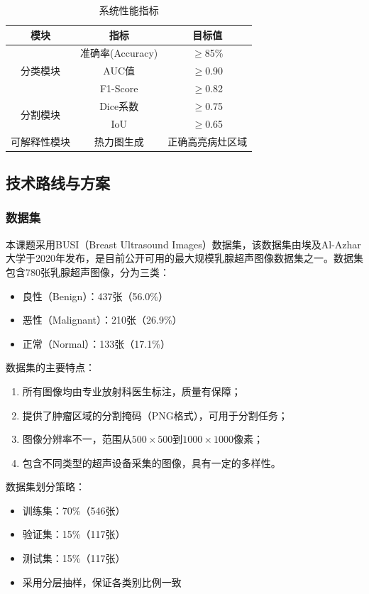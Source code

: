 \documentclass[supercite]{Hust-undergraduate-kaiti}
\theoremstyle{definition}
\begin{document}
\begin{table}[htb]
\centering
\caption{系统性能指标}
\begin{tabular}{|c|c|c|}
\hline
\textbf{模块} & \textbf{指标} & \textbf{目标值} \\ \hline
\multirow{3}{*}{分类模块} & 准确率(Accuracy) & $\geq$85\% \\ \cline{2-3}
 & AUC值 & $\geq$0.90 \\ \cline{2-3}
 & F1-Score & $\geq$0.82 \\ \hline
\multirow{2}{*}{分割模块} & Dice系数 & $\geq$0.75 \\ \cline{2-3}
 & IoU & $\geq$0.65 \\ \hline
可解释性模块 & 热力图生成 & 正确高亮病灶区域 \\ \hline
\end{tabular}
\end{table}

\subsection{技术路线与方案}

\subsubsection{数据集}

本课题采用BUSI（Breast Ultrasound Images）数据集\cite{ref6}，该数据集由埃及Al-Azhar大学于2020年发布，是目前公开可用的最大规模乳腺超声图像数据集之一。数据集包含780张乳腺超声图像，分为三类：
\begin{itemize}
    \item 良性（Benign）：437张（56.0\%）
    \item 恶性（Malignant）：210张（26.9\%）
    \item 正常（Normal）：133张（17.1\%）
\end{itemize}

数据集的主要特点：
\begin{enumerate}
    \item 所有图像均由专业放射科医生标注，质量有保障；
    \item 提供了肿瘤区域的分割掩码（PNG格式），可用于分割任务；
    \item 图像分辨率不一，范围从$500\times500$到$1000\times1000$像素；
    \item 包含不同类型的超声设备采集的图像，具有一定的多样性。
\end{enumerate}

数据集划分策略：
\begin{itemize}
    \item 训练集：70\%（546张）
    \item 验证集：15\%（117张）
    \item 测试集：15\%（117张）
    \item 采用分层抽样，保证各类别比例一致
\end{itemize}
\end{document}
